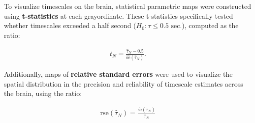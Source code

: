 \documentclass[main.tex]{subfiles}
\begin{document}
To visualize timescales on the brain, statistical parametric maps were constructed using \textbf{t-statistics} at each grayordinate. These t-statistics specifically tested whether timescales exceeded a half second  ($H_0: \tau \le 0.5 \text{ sec.}$), computed as the ratio:

\begin{align}\label{eq:t-ratio}
    t_N = \frac{\hat\tau_N-0.5}{\widehat{\text{se}}(\hat\tau_N)}.
\end{align}

\noindent Additionally, maps of \textbf{relative standard errors} were used to visualize the spatial distribution in the precision and reliability of timescale estimates across the brain, using the ratio:

\begin{align}
    \text{rse}(\hat\tau_N) = \frac{\widehat{\text{se}}(\hat\tau_N)}{\hat\tau_N}
\end{align}
\end{document}
